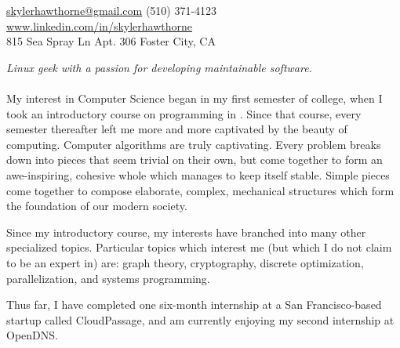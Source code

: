 \documentclass[10pt]{article}
\begin{document}
\sloppy  %



\nobreakvspace{0.3em}  %

\noindent\href{mailto:skyler.hawthorne.at.gmail.dot.com}{skylerhawthorne\mbox{}@\mbox{}gmail.com}\sbull
(510) 371-4123\sbull
\href{http://www.linkedin.com/in/skylerhawthorne}{www.linkedin.com/in/skylerhawthorne}
\\
815 Sea Spray Ln\sbull
Apt. 306\sbull
Foster City, CA

\spacedhrule{0.9em}{-0.4em}  %


\vspace{-1.3em}  %
\begin{multicols}{2}  %
\noindent \emph{Linux geek with a passion for developing maintainable software.}
\\
\\
My interest in Computer Science began in my first semester of college, when I took an introductory course on programming in \CPP. Since that course, every semester thereafter left me more and more captivated by the beauty of computing. Computer algorithms are truly captivating. Every problem breaks down into pieces that seem trivial on their own, but come together to form an awe-inspiring, cohesive whole which manages to keep itself stable. Simple pieces come together to compose elaborate, complex, mechanical structures which form the foundation of our modern society.

Since my introductory course, my interests have branched into many other specialized topics. Particular topics which interest me (but which I do not claim to be an expert in) are: graph theory, cryptography, discrete optimization, parallelization, and systems programming.

Thus far, I have completed one six-month internship at a San Francisco-based startup called CloudPassage, and am currently enjoying my second internship at OpenDNS.
\end{multicols}
\end{document}
